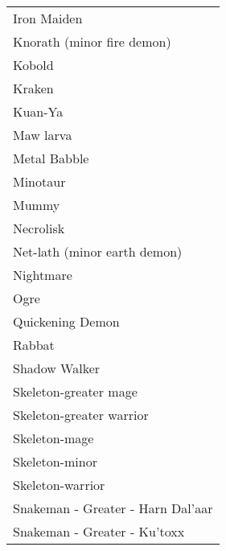 \documentclass[twoside]{book}
\begin{document}
\begin{longtable}{p{1.25in}}
  \raggedright
           Iron Maiden 
  \tabularnewline
      
  \raggedright
           Knorath (minor fire demon)
           
  \tabularnewline
      
  \raggedright
           Kobold 
  \tabularnewline
      
  \raggedright
           Kraken 
  \tabularnewline
      
  \raggedright
           Kuan-Ya 
  \tabularnewline
      
  \raggedright
           Maw larva 
  \tabularnewline
      
  \raggedright
           Metal Babble 
  \tabularnewline
      
  \raggedright
           Minotaur 
  \tabularnewline
      
  \raggedright
           Mummy 
  \tabularnewline
      
  \raggedright
           Necrolisk 
  \tabularnewline
      
  \raggedright
           Net-lath (minor earth demon)
           
  \tabularnewline
      
  \raggedright
           Nightmare 
  \tabularnewline
      
  \raggedright
           Ogre 
  \tabularnewline
      
  \raggedright
           Quickening Demon 
  \tabularnewline
      
  \raggedright
           Rabbat 
  \tabularnewline
      
  \raggedright
           Shadow Walker 
  \tabularnewline
      
  \raggedright
           Skeleton-greater mage 
  \tabularnewline
      
  \raggedright
           Skeleton-greater warrior
           
  \tabularnewline
      
  \raggedright
           Skeleton-mage 
  \tabularnewline
      
  \raggedright
           Skeleton-minor 
  \tabularnewline
      
  \raggedright
           Skeleton-warrior 
  \tabularnewline
      
  \raggedright
           Snakeman - Greater - Harn
           Dal'aar 
  \tabularnewline
      
  \raggedright
           Snakeman - Greater -
           Ku'toxx 
  \tabularnewline
      

\end{longtable}
\end{document}
